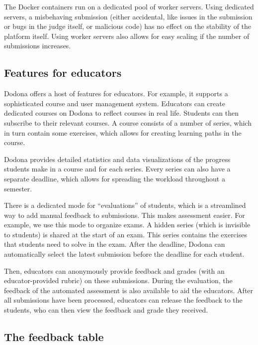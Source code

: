 \documentclass[../main]{subfiles}
\begin{document}
The Docker containers run on a dedicated pool of worker servers.
Using dedicated servers, a misbehaving submission (either accidental, like issues in the submission or bugs in the judge itself, or malicious code) has no effect on the stability of the platform itself.
Using worker servers also allows for easy scaling if the number of submissions increases.

\subsection{Features for educators}\label{subsec:features-for-educators}

Dodona offers a host of features for educators.
For example, it supports a sophisticated course and user management system.
Educators can create dedicated courses on Dodona to reflect courses in real life.
Students can then subscribe to their relevant courses.
A course consists of a number of series, which in turn contain some exercises, which allows for creating learning paths in the course.

Dodona provides detailed statistics and data visualizations of the progress students make in a course and for each series.
Every series can also have a separate deadline, which allows for spreading the workload throughout a semester.

There is a dedicated mode for ``evaluations'' of students, which is a streamlined way to add manual feedback to submissions.
This makes assessment easier.
For example, we use this mode to organize exams.
A hidden series (which is invisible to students) is shared at the start of an exam.
This series contains the exercises that students need to solve in the exam.
After the deadline, Dodona can automatically select the latest submission before the deadline for each student.

Then, educators can anonymously provide feedback and grades (with an educator-provided rubric) on these submissions.
During the evaluation, the feedback of the automated assessment is also available to aid the educators.
After all submissions have been processed, educators can release the feedback to the students, who can then view the feedback and grade they received.

\subsection{The feedback table}\label{subsec:the-feedback-table}
\end{document}
